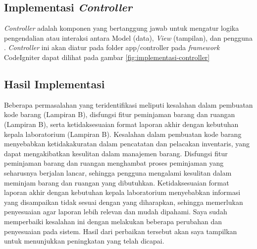 \subsection{Implementasi \textit{Controller}}
\textit{Controller} adalah komponen yang bertanggung jawab untuk mengatur logika pengendalian atau interaksi antara Model (data), \textit{View} (tampilan), dan pengguna \cite{rahman2018perancangan}. \textit{Controller} ini akan diatur pada folder app/controller pada \textit{framework} CodeIgniter dapat dilihat pada gambar \ref{fig:implementasi-controller}



\subsection{Hasil Implementasi}
Beberapa permasalahan yang teridentifikasi meliputi kesalahan dalam pembuatan kode barang (Lampiran B), disfungsi fitur peminjaman barang dan ruangan (Lampiran B), serta ketidaksesuaian format laporan akhir dengan kebutuhan kepala laboratorium (Lampiran B). Kesalahan dalam pembuatan kode barang menyebabkan ketidakakuratan dalam pencatatan dan pelacakan inventaris, yang dapat mengakibatkan kesulitan dalam manajemen barang. Disfungsi fitur peminjaman barang dan ruangan menghambat proses peminjaman yang seharusnya berjalan lancar, sehingga pengguna mengalami kesulitan dalam meminjam barang dan ruangan yang dibutuhkan. Ketidaksesuaian format laporan akhir dengan kebutuhan kepala laboratorium menyebabkan informasi yang disampaikan tidak sesuai dengan yang diharapkan, sehingga memerlukan penyesuaian agar laporan lebih relevan dan mudah dipahami. Saya sudah memperbaiki kesalahan ini dengan melakukan beberapa perubahan dan penyesuaian pada sistem. Hasil dari perbaikan tersebut akan saya tampilkan untuk menunjukkan peningkatan yang telah dicapai.

